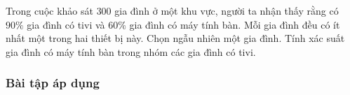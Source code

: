 \begin{vd}%
	Trong cuộc khảo sát $300$ gia đình ở một khu vực, người ta nhận thấy rằng có $90\%$ gia đình có tivi và $60\%$ gia đình có máy tính bàn. Mỗi gia đình đều có ít nhất một trong hai thiết bị này. Chọn ngẫu nhiên một gia đình. Tính xác suất gia đình có máy tính bàn trong nhóm các gia đình có tivi.
\end{vd}
\subsubsection{Bài tập áp dụng}

